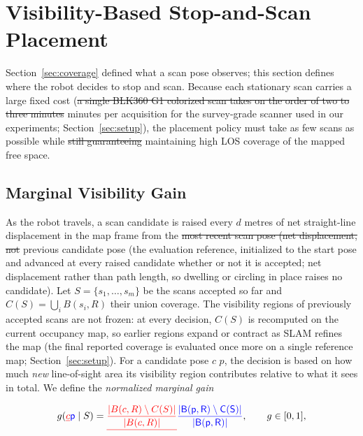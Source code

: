 \documentclass[sensors,article,submit,pdftex,moreauthors]{Definitions/mdpi}
\providecommand{\DIFadd}[1]{{\protect\color{blue} \sf #1}} %
\providecommand{\DIFdel}[1]{{\protect\color{red}\protect\scriptsize\protect\sout{#1}}} %
\providecommand{\DIFaddbegin}{} %
\providecommand{\DIFaddend}{} %
\providecommand{\DIFdelbegin}{} %
\providecommand{\DIFdelend}{} %
\begin{document}
\DIFaddend \section{Visibility-Based Stop-and-Scan Placement}
\label{sec:placement}

Section~\ref{sec:coverage} defined what a scan pose observes; this section
defines where the robot decides to stop and scan. Because each stationary scan
carries a large fixed cost (\DIFdelbegin \DIFdel{a single BLK360 G1 colorized scan takes on the order
of two to three minutes }\DIFdelend \DIFaddbegin \DIFadd{minutes per acquisition for the survey-grade
scanner used in our experiments; Section~\ref{sec:setup}}\DIFaddend ), the placement
policy must take as few scans as possible while \DIFdelbegin \DIFdel{still guaranteeing }\DIFdelend \DIFaddbegin \DIFadd{maintaining high }\DIFaddend LOS coverage
of the \DIFaddbegin \DIFadd{mapped }\DIFaddend free space.

\subsection{Marginal Visibility Gain}

As the robot travels, a scan candidate is raised every $d$ metres of \DIFaddbegin \DIFadd{net
}\DIFaddend straight-line displacement in the map frame from the \DIFdelbegin \DIFdel{most recent scan pose
(net
displacement, not }\DIFdelend \DIFaddbegin \DIFadd{previous candidate pose
(the evaluation reference, initialized to the start pose and advanced at every
raised candidate whether or not it is accepted; net displacement rather than
}\DIFaddend path length, so dwelling or circling in place raises no candidate). Let $S=\{s_1,\dots,s_m\}$ be the scans accepted so far and
$C(S)=\bigcup_i B(s_i,R)$ their union coverage. \DIFaddbegin \DIFadd{The visibility regions of
previously accepted scans are not frozen: at every decision, $C(S)$ is
recomputed on the current occupancy map, so earlier regions expand or contract
as SLAM refines the map (the final reported coverage is evaluated once more on
a single reference map; Section~\ref{sec:setup}). }\DIFaddend For a candidate pose \DIFdelbegin \DIFdel{$c$}\DIFdelend \DIFaddbegin \DIFadd{$p$}\DIFaddend ,
the decision is based on how much \emph{new} line-of-sight area its visibility
region contributes relative to what it sees in total. We define the
\emph{\DIFaddbegin \DIFadd{normalized }\DIFaddend marginal gain}

\begin{equation}
g(\DIFdelbegin \DIFdel{c}\DIFdelend \DIFaddbegin \DIFadd{p}\DIFaddend \mid S)=\DIFdelbegin \DIFdel{\frac{\lvert B(c,R)\setminus C(S)\rvert}{\lvert B(c,R)\rvert}}\DIFdelend \DIFaddbegin \DIFadd{\frac{\lvert B(p,R)\setminus C(S)\rvert}{\lvert B(p,R)\rvert}}\DIFaddend ,
\qquad g\in[0,1],
\end{equation}
\end{document}
